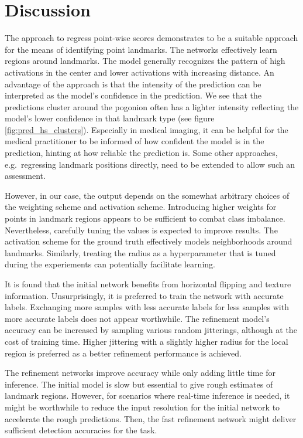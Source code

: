 \documentclass[class=article, crop=false]{standalone}
\begin{document}
\section{Discussion}
The approach to regress point-wise scores demonstrates to be a suitable approach for the means of identifying point landmarks. The networks effectively learn regions around landmarks. The model generally recognizes the pattern of high activations in the center and lower activations with increasing distance. An advantage of the approach is that the intensity of the prediction can be interpreted as the model's confidence in the prediction. We see that the predictions cluster around the pogonion often has a lighter intensity reflecting the model's lower confidence in that landmark type (see figure \ref{fig:pred_hs_clusters}). Especially in medical imaging, it can be helpful for the medical practitioner to be informed of how confident the model is in the prediction, hinting at how reliable the prediction is. Some other approaches, e.g.\ regressing landmark positions directly, need to be extended to allow such an assessment.

However, in our case, the output depends on the somewhat arbitrary choices of the weighting scheme and activation scheme. Introducing higher weights for points in landmark regions appears to be sufficient to combat class imbalance. Nevertheless, carefully tuning the values is expected to improve results. The activation scheme for the ground truth effectively models neighborhoods around landmarks. Similarly, treating the radius as a hyperparameter that is tuned during the experiements can potentially facilitate learning.

It is found that the initial network benefits from horizontal flipping and texture information. Unsurprisingly, it is preferred to train the network with accurate labels. Exchanging more samples with less accurate labels for less samples with more accurate labels does not appear worthwhile. 
The refinement model's accuracy can be increased by sampling various random jitterings, although at the cost of training time. Higher jittering with a slightly higher radius for the local region is preferred as a better refinement performance is achieved.




The refinement networks improve accuracy while only adding little time for inference. The initial model is slow but essential to give rough estimates of landmark regions. However, for scenarios where real-time inference is needed, it might be worthwhile to reduce the input resolution for the initial network to accelerate the rough predictions. Then, the fast refinement network might deliver sufficient detection accuracies for the task.
\end{document}
